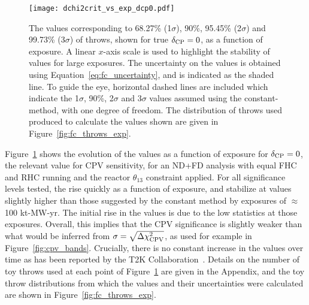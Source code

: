 \begin{figure}[htbp]
  \centering
  \texttt{[image: dchi2crit\_vs\_exp\_dcp0.pdf]}
  \caption{The \dchisqcrit values corresponding to 68.27\% (1$\sigma$), 90\%, 95.45\% (2$\sigma$) and 99.73\% (3$\sigma$) of throws, shown for true $\delta_{\rm CP} = 0$, as a function of exposure. A linear $x$-axis scale is used to highlight the stability of \dchisqcrit values for large exposures. The uncertainty on the \dchisqcrit values is obtained using Equation~\ref{eq:fc_uncertainty}, and is indicated as the shaded line. To guide the eye, horizontal dashed lines are included which indicate the 1$\sigma$, 90\%, 2$\sigma$ and 3$\sigma$ \dchisq values assumed using the constant-\dchisq method, with one degree of freedom. The distribution of throws used produced to calculate the \dchisqcrit values shown are given in Figure~\ref{fig:fc_throws_exp}.}
  \label{fig:fc_vs_exp}
\end{figure}
Figure~\ref{fig:fc_vs_exp} shows the evolution of the \dchisqcrit values as a function of exposure for $\delta_{\rm CP} = 0$, the relevant value for CPV sensitivity, for an ND+FD analysis with equal FHC and RHC running and the reactor $\theta_{13}$ constraint applied.
For all significance levels tested, the \dchisqcrit rise quickly as a function of exposure, and stabilize at values slightly higher than those suggested by the constant \dchisq method by exposures of $\approx$100 kt-MW-yr. The initial rise in the \dchisqcrit values is due to the low statistics at those exposures. Overall, this implies that the CPV significance is slightly weaker than what would be inferred from $\sigma = \sqrt{\Delta\chi^{2}_{\mathrm{CPV}}}$, as used for example in Figure~\ref{fig:cpv_bands}. Crucially, there is no constant increase in the \dchisqcrit values over time as has been reported by the T2K Collaboration~\cite{Abe:2021gky}. Details on the number of toy throws used at each point of Figure~\ref{fig:fc_vs_exp} are given in the Appendix, and the toy throw distributions from which the \dchisqcrit values and their uncertainties were calculated are shown in Figure~\ref{fig:fc_throws_exp}.

